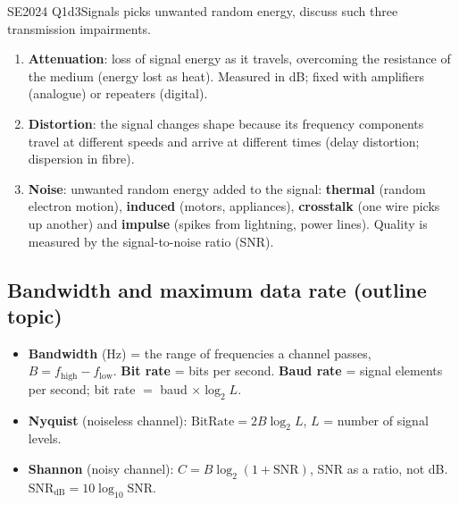 \documentclass[10pt]{article}
\begin{document}
\begin{pastq}{SE2024 Q1d}{3}Signals picks unwanted random energy, discuss such three transmission impairments.\end{pastq}
\begin{ans}
\begin{enumerate}
\item \textbf{Attenuation}: loss of signal energy as it travels, overcoming the resistance of the medium (energy lost as heat). Measured in dB; fixed with amplifiers (analogue) or repeaters (digital).
\item \textbf{Distortion}: the signal changes shape because its frequency components travel at different speeds and arrive at different times (delay distortion; dispersion in fibre).
\item \textbf{Noise}: unwanted random energy added to the signal: \textbf{thermal} (random electron motion), \textbf{induced} (motors, appliances), \textbf{crosstalk} (one wire picks up another) and \textbf{impulse} (spikes from lightning, power lines). Quality is measured by the signal-to-noise ratio (SNR).
\end{enumerate}
\end{ans}

\subsection{Bandwidth and maximum data rate (outline topic)}
\begin{itemize}
\item \textbf{Bandwidth} (Hz) = the range of frequencies a channel passes, $B = f_{\text{high}} - f_{\text{low}}$. \textbf{Bit rate} = bits per second. \textbf{Baud rate} = signal elements per second; bit rate $=$ baud $\times \log_2 L$.
\item \textbf{Nyquist} (noiseless channel): $\text{BitRate} = 2B\log_2 L$, $L$ = number of signal levels.
\item \textbf{Shannon} (noisy channel): $C = B\log_2(1+\text{SNR})$, SNR as a ratio, not dB. $\text{SNR}_{\text{dB}} = 10\log_{10}\text{SNR}$.
\end{itemize}
\end{document}
